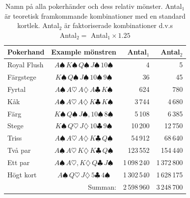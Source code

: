 \documentclass[swedish,a4paper]{article}
\begin{document}
\begin{table}[H] 
\captionsetup{width=0.5\textwidth, justification=centering}
\caption{Namn på alla pokerhänder och dess relativ mönster. Antal$_1$ är 
teoretisk framkommande kombinationer med en standard kortlek. Antal$_2$ är 
faktoriserade kombinationer d.v.s \\ Antal$_2 = $ Antal$_1 \times 1.25$ }
\label{tab:all_poker_hands}
	\centering
	\begin{tabular}{|l|c|r|r|}
	
	\hline 
	Pokerhand 
	& Example mönstren 
	& Antal$_1$ 
	& Antal$_2$ 
	\\ \hline  

	Royal Flush 
	& $A\spadesuit\, K\spadesuit\, Q\spadesuit\, J\spadesuit\, 10\spadesuit$
	& 4 
	& 5
	\\ \hline

	Färgstege
	& $K\spadesuit\, Q\spadesuit\, J\spadesuit\, 10\spadesuit\, 9\spadesuit$
	& 36 
	& 45
	\\ \hline

	Fyrtal 
	& $A\spadesuit\,A\heartsuit\,A\diamondsuit\,A\clubsuit\, K\spadesuit$ 
	& 624 
	& 780
	\\ \hline

	Kåk 
	& $A\spadesuit\, A\heartsuit\, A\diamondsuit\, K\clubsuit\,K\spadesuit$ 
	& 3\,744
	& 4\,680
	\\ \hline

	Färg
	& $K\spadesuit\, Q\spadesuit\, J\spadesuit, 10\spadesuit\, 8\spadesuit$
	& 5\,108
	& 6\,385
	\\ \hline

	Stege 
	& $K\spadesuit\, Q\heartsuit\, J\diamondsuit\, 10\clubsuit\,9\spadesuit$ 
	& 10\,200
	& 12\,750
	\\ \hline
	Triss 
	& $A\spadesuit\, A\heartsuit\, A\diamondsuit\, K\clubsuit\, Q\spadesuit$
	& 54\,912
	& 68\,640
	\\ \hline

	Två par 
	& $A\spadesuit\, A\heartsuit\, K\diamondsuit\, K\clubsuit\, Q\spadesuit$
	& 123\,552
	& 154\,440
	\\ \hline

	Ett par 
	& $A\spadesuit\, A\heartsuit, K\diamondsuit\, Q\clubsuit\, J\spadesuit$ 
	& 1\,098\,240 
	& 1\,372\,800
	\\ \hline

	Högt kort
	& $A\spadesuit\, Q\heartsuit\, J\diamondsuit\, 5\clubsuit\, 4\spadesuit$
	& 1\,302\,540
	& 1\,628\,175
	\\ \hline

	 
	\multicolumn{2}{|r|}{Summan:} 
	& 2\,598\,960 
	& 3\,248\,700
	\\ \hline
\end{tabular}
\end{table}
\end{document}
